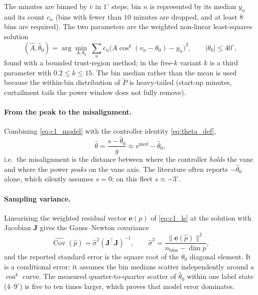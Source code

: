 \documentclass[11pt,a4paper]{article}
\theoremstyle{remark}
\newcommand{\med}{\operatorname{med}}
\newcommand{\Cov}{\operatorname{Cov}}
\newcommand{\dg}{^{\circ}}
\begin{document}
The minutes are binned by $\bar v$ in $1\dg$ steps; bin $n$ is represented by
its median $y_n$ and its count $c_n$ (bins with fewer than $10$ minutes are
dropped, and at least $8$ bins are required). The two parameters are the
weighted non-linear least-squares solution
\begin{equation}
  (\hat A,\hat\theta_0) = \arg\min_{A,\theta_0}\ \sum_n c_n\big(A\cos^k(v_n-\theta_0) - y_n\big)^2 ,
  \qquad |\theta_0|\le40\dg,
  \label{eq:c1_ls}
\end{equation}
found with a bounded trust-region method; in the free-$k$ variant $k$ is a third
parameter with $0.2\le k\le15$. The bin median rather than the mean is used
because the within-bin distribution of $\tilde P$ is heavy-tailed (start-up
minutes, curtailment tails the power window does not fully remove).

\paragraph{From the peak to the misalignment.} Combining \eqref{eq:c1_model}
with the controller identity \eqref{eq:theta_def},
\begin{equation}
  \hat\theta = \frac{s-\hat\theta_0}{g} \approx v^{\med} - \hat\theta_0 ,
  \label{eq:c1_theta}
\end{equation}
i.e.\ the misalignment is the distance between where the controller \emph{holds}
the vane and where the power \emph{peaks} on the vane axis. The literature often
reports $-\hat\theta_0$ alone, which silently assumes $s=0$; on this fleet
$s\approx-3\dg$.

\paragraph{Sampling variance.} Linearising the weighted residual vector
$\mathbf e(p)$ of \eqref{eq:c1_ls} at the solution with Jacobian $\mathbf J$
gives the Gauss--Newton covariance
\begin{equation}
  \widehat{\Cov}(\hat p) = \hat\sigma^2 (\mathbf J^\top\mathbf J)^{-1},
  \qquad
  \hat\sigma^2 = \frac{\|\mathbf e(\hat p)\|^2}{n_{\mathrm{bins}} - \dim p},
  \label{eq:gn_cov}
\end{equation}
and the reported standard error is the square root of the $\theta_0$ diagonal
element. It is a conditional error: it assumes the bin medians scatter
independently around a $\cos^k$ curve. The measured quarter-to-quarter scatter
of $\hat\theta_0$ within one label state ($4$--$9\dg$) is five to ten times
larger, which proves that model error dominates.
\end{document}
